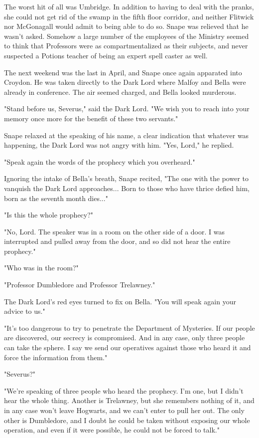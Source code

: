 The worst hit of all was Umbridge. In addition to having to deal with the pranks, she could not get rid of the swamp in the fifth floor corridor, and neither Flitwick nor McGonagall would admit to being able to do so. Snape was relieved that he wasn't asked. Somehow a large number of the employees of the Ministry seemed to think that Professors were as compartmentalized as their subjects, and never suspected a Potions teacher of being an expert spell caster as well.

The next weekend was the last in April, and Snape once again apparated into Croydon. He was taken directly to the Dark Lord where Malfoy and Bella were already in conference. The air seemed charged, and Bella looked murderous.

"Stand before us, Severus," said the Dark Lord. "We wish you to reach into your memory once more for the benefit of these two servants."

Snape relaxed at the speaking of his name, a clear indication that whatever was happening, the Dark Lord was not angry with him. "Yes, Lord," he replied.

"Speak again the words of the prophecy which you overheard."

Ignoring the intake of Bella's breath, Snape recited, "The one with the power to vanquish the Dark Lord approaches... Born to those who have thrice defied him, born as the seventh month dies..."

"Is this the whole prophecy?"

"No, Lord. The speaker was in a room on the other side of a door. I was interrupted and pulled away from the door, and so did not hear the entire prophecy."

"Who was in the room?"

"Professor Dumbledore and Professor Trelawney."

The Dark Lord's red eyes turned to fix on Bella. "You will speak again your advice to us."

"It's too dangerous to try to penetrate the Department of Mysteries. If our people are discovered, our secrecy is compromised. And in any case, only three people can take the sphere. I say we send our operatives against those who heard it and force the information from them."

"Severus?"

"We're speaking of three people who heard the prophecy. I'm one, but I didn't hear the whole thing. Another is Trelawney, but she remembers nothing of it, and in any case won't leave Hogwarts, and we can't enter to pull her out. The only other is Dumbledore, and I doubt he could be taken without exposing our whole operation, and even if it were possible, he could not be forced to talk."

